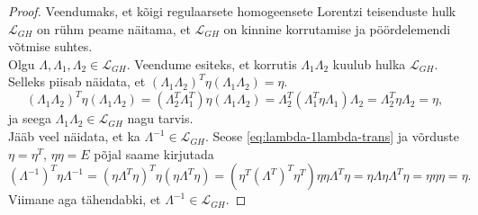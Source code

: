 \documentclass[a4paper,12pt]{article}
\numberwithin{equation}{section}
\begin{document}
\begin{proof}
Veendumaks, et kõigi regulaarsete homogeensete Lorentzi teisenduste hulk $\mathcal{L}_{GH}$ on rühm peame näitama, et $\mathcal{L}_{GH}$ on kinnine korrutamise ja pöörd\-elemendi võtmise suhtes.\\
Olgu $\Lambda, \Lambda_1, \Lambda_2 \in \mathcal{L}_{GH}$. Veendume esiteks, et korrutis $\Lambda_1 \Lambda_2$ kuulub hulka $\mathcal{L}_{GH}$. Selleks piisab näidata, et $\left(\Lambda_1 \Lambda_2\right)^T \eta \left(\Lambda_1 \Lambda_2\right) = \eta$.
\begin{equation*}
\left(\Lambda_1 \Lambda_2\right)^T \eta \left(\Lambda_1 \Lambda_2\right) = \left(\Lambda_2^T \Lambda_1^T\right) \eta \left(\Lambda_1 \Lambda_2\right) = \Lambda_2^T \left(\Lambda_1^T \eta \Lambda_1 \right) \Lambda_2 = \Lambda_2^T \eta \Lambda_2 = \eta,
\end{equation*}
ja seega $\Lambda_1 \Lambda_2 \in \mathcal{L}_{GH}$ nagu tarvis. \\
Jääb veel näidata, et ka $\Lambda^{-1 } \in \mathcal{L}_{GH}$. Seose \ref{eq:lambda-1lambda-trans} ja võrduste $\eta = \eta^T$, $\eta \eta = E$ põjal saame kirjutada
\begin{equation*}
\left(\Lambda^{-1}\right)^T \eta \Lambda^{-1} = \left(\eta \Lambda^T \eta \right)^T \eta \left(\eta \Lambda^T \eta\right) = \left(\eta^T \left(\Lambda^T\right)^T \eta^T \right) \eta \eta \Lambda^T \eta = \eta \Lambda \eta \Lambda^T \eta = \eta \eta \eta = \eta.
\end{equation*}
Viimane aga tähendabki, et $\Lambda^{-1} \in \mathcal{L}_{GH}$.
\end{proof}
\end{document}
